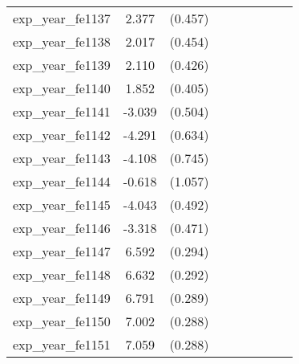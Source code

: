 {\begin{tabular}{l*{4}{cc}}
exp\_year\_fe1137&    2.377\sym{***}&  (0.457)&                  &         &                  &         &                  &         \\
exp\_year\_fe1138&    2.017\sym{***}&  (0.454)&                  &         &                  &         &                  &         \\
exp\_year\_fe1139&    2.110\sym{***}&  (0.426)&                  &         &                  &         &                  &         \\
exp\_year\_fe1140&    1.852\sym{***}&  (0.405)&                  &         &                  &         &                  &         \\
exp\_year\_fe1141&   -3.039\sym{***}&  (0.504)&                  &         &                  &         &                  &         \\
exp\_year\_fe1142&   -4.291\sym{***}&  (0.634)&                  &         &                  &         &                  &         \\
exp\_year\_fe1143&   -4.108\sym{***}&  (0.745)&                  &         &                  &         &                  &         \\
exp\_year\_fe1144&   -0.618         &  (1.057)&                  &         &                  &         &                  &         \\
exp\_year\_fe1145&   -4.043\sym{***}&  (0.492)&                  &         &                  &         &                  &         \\
exp\_year\_fe1146&   -3.318\sym{***}&  (0.471)&                  &         &                  &         &                  &         \\
exp\_year\_fe1147&    6.592\sym{***}&  (0.294)&                  &         &                  &         &                  &         \\
exp\_year\_fe1148&    6.632\sym{***}&  (0.292)&                  &         &                  &         &                  &         \\
exp\_year\_fe1149&    6.791\sym{***}&  (0.289)&                  &         &                  &         &                  &         \\
exp\_year\_fe1150&    7.002\sym{***}&  (0.288)&                  &         &                  &         &                  &         \\
exp\_year\_fe1151&    7.059\sym{***}&  (0.288)&                  &         &                  &         &                  &         \\

\end{tabular}}

